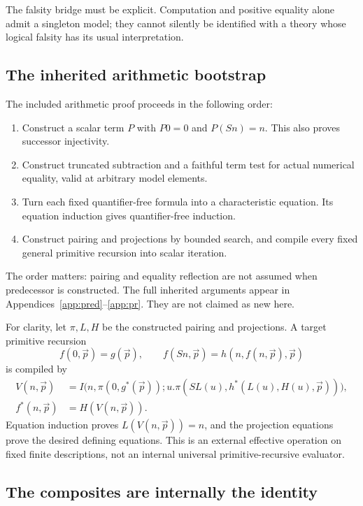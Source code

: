 \documentclass[11pt]{article}
\theoremstyle{definition}
\begin{document}
The falsity bridge must be explicit. Computation and positive equality
alone admit a singleton model; they cannot silently be identified with
a theory whose logical falsity has its usual interpretation.

\subsection{The inherited arithmetic bootstrap}

The included arithmetic proof proceeds in the following order:
\begin{enumerate}
\item Construct a scalar term $P$ with $P0=0$ and $P(Sn)=n$.
      This also proves successor injectivity.
\item Construct truncated subtraction and a faithful term test for
      actual numerical equality, valid at arbitrary model elements.
\item Turn each fixed quantifier-free formula into a characteristic
      equation. Its equation induction gives quantifier-free induction.
\item Construct pairing and projections by bounded search, and compile
      every fixed general primitive recursion into scalar iteration.
\end{enumerate}
The order matters: pairing and equality reflection are not assumed when
predecessor is constructed. The full inherited arguments appear in
Appendices~\ref{app:pred}--\ref{app:pr}. They are not claimed as new here.

For clarity, let $\pi,L,H$ be the constructed pairing and projections.
A target primitive recursion
\[
 f(0,\vec p)=g(\vec p),\qquad
 f(Sn,\vec p)=h(n,f(n,\vec p),\vec p)
\]
is compiled by
\[
\begin{aligned}
 V(n,\vec p)&=I\bigl(n,\pi(0,g^*(\vec p));
    u.\pi(SL(u),h^*(L(u),H(u),\vec p))\bigr),\\
 f^*(n,\vec p)&=H(V(n,\vec p)).
\end{aligned}
\]
Equation induction proves $L(V(n,\vec p))=n$, and the projection
equations prove the desired defining equations. This is an external
effective operation on fixed finite descriptions, not an internal
universal primitive-recursive evaluator.

\subsection{The composites are internally the identity}
\end{document}
